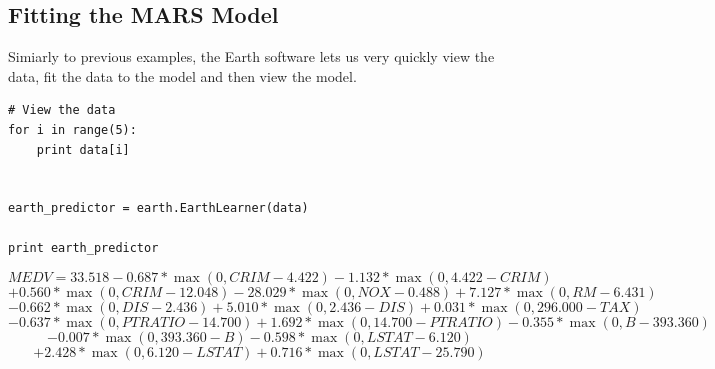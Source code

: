 \subsection{Fitting the MARS Model} %

Simiarly to previous examples, the Earth software lets us very quickly view the data, fit the data to the model and then view the model. 
\begin{lstlisting}[caption={Load the Data and Explore},label=2nd,firstnumber=53]
# View the data
for i in range(5):
    print data[i]


earth_predictor = earth.EarthLearner(data)

print earth_predictor
\end{lstlisting}

\begin{equation}
	MEDV =
   33.518
   -0.687 * \max(0, CRIM - 4.422)
   -1.132 * \max(0, 4.422 - CRIM)
\end{equation}
\begin{equation}
\nonumber
+0.560 * \max(0, CRIM - 12.048)-28.029 * \max(0, NOX - 0.488)+7.127 * \max(0, RM - 6.431)
\end{equation}
\begin{equation}
\nonumber
   -0.662 * \max(0, DIS - 2.436)
   +5.010 * \max(0, 2.436 - DIS)
   +0.031 * \max(0, 296.000 - TAX)
\end{equation}
\begin{equation}
\nonumber
-0.637 * \max(0, PTRATIO - 14.700)
   +1.692 * \max(0, 14.700 - PTRATIO)
   -0.355 * \max(0, B - 393.360)
\end{equation}
\begin{equation}
\nonumber
-0.007 * \max(0, 393.360 - B)
   -0.598 * \max(0, LSTAT - 6.120)
\end{equation}
\begin{equation}
\nonumber
   +2.428 * \max(0, 6.120 - LSTAT)
   +0.716 * \max(0, LSTAT - 25.790)
\end{equation}

